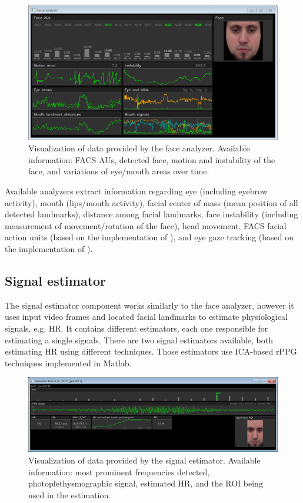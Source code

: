 \begin{figure}
    \centering
    \includegraphics[width=\textwidth]{figures/tool-ui-face-analyzer.png}
    \caption{Visualization of data provided by the face analyzer. Available information: FACS AUs, detected face, motion and instability of the face, and variations of eye/mouth areas over time.}
    \label{fig:tool-ui-face-analyzer}
\end{figure}

Available analyzers extract information regarding eye (including eyebrow activity), mouth (lips/mouth activity), facial center of mass (mean position of all detected landmarks), distance among facial landmarks, face instability (including measurement of movement/rotation of the face), head movement, FACS facial action units (based on the implementation of \textcite{baltruvsaitis2015cross}), and eye gaze tracking (based on the implementation of \textcite{wood2015rendering}).

\subsection{Signal estimator}

The signal estimator component works similarly to the face analyzer, however it uses input video frames and located facial landmarks to estimate physiological signals, e.g. HR. It contains different estimators, each one responsible for estimating a single signals. There are two signal estimators available, both estimating HR using different techniques. Those estimators use ICA-based rPPG techniques \parencite{poh2010non,poh2011advancements} implemented in Matlab.

\begin{figure}
    \centering
    \includegraphics[width=\textwidth]{figures/tool-ui-signal-estimator.png}
    \caption{Visualization of data provided by the signal estimator. Available information: most prominent frequencies detected, photoplethysmographic signal, estimated HR, and the ROI being used in the estimation.}
    \label{fig:tool-ui-signal-estimator}
\end{figure}

